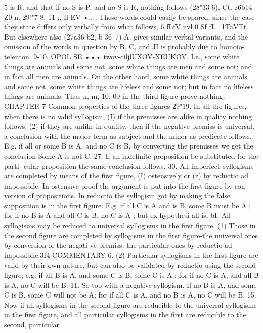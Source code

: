 {5 is R. and that if no S is P, and no S is R, nothing follows
(28"33-6). Ct. z6b14-Z0 n.
29'"7-8. 11 ;, Il EV •.. \nrapxn. These words could easily be
spared, since the case they state differs only verbally from what
follows, 6 fLfV nvl 0 Sf fL~ 1TaVTt. But elsewhere also (27a36-b2,
b 36--7) A. gives similar verbal variants, and the omission of the
words in question by B, C, and JI is probably due to homoio-
teleuton.
9-10. OPOL SE ••• twov-ciljlUXOV-XEUKOV. I.e., some white things
are animals and some not, some white things are men and some
not; and in fact all men are animals. On the other hand, some
white things are animals and some not, some white things are
lifeless and some not; but in fact no lifeless things are animals.
Thus n, m, 10, 00 in the third figure prove nothing.
CHAPTER 7
Common properties of the three figures
29"19. In all the figures, when there is no valid syllogism, (I)
if the premisses are alike in quality nothing follows; (2) if they are
unlike in quality, then if the negative premiss is universal, a
conclusion with the major term as subject and the minor as
predicate follows. E.g. if all or some B is A, and no C is B, by
converting the premisses we get the conclusion Some A is not C.
27. If an indefinite proposition be substituted for the parti-
cular proposition the same conclusion follows.
30. All imperfect syllogisms are completed by means of the
first figure, (I) ostensively or (z) by reductio ad impossibile. In
ostensive proof the argument is put into the first figure by con-
version of propositions. In reductio the syllogism got by making
the false supposition is in the first figure. E.g. if all C is A and is
B, some B must be A ; for if no B is A and all C is B, no C is
A ; but ex hypothesi all is.
bI. All syllogisms may be reduced to universal syllogisms in the
first figure. (1) Those in the second figure are completed by
syllogisms in the first figure-the universal ones by conversion of
the negati ve premiss, the particular ones by reductio ad impossibile.3I4
COMMENTARY
6. (2) Particular syllogisms in the first figure are valid by their
own nature, but can also be validated by reductio using the
second figure; e.g. if all B is A, and some C is B, some C is A ; for
if no C is A, and all B is A, no C will be B.
11. So too with a negative syllogism. If no B is A, and some
C is B, some C will not be A; for if all C is A, and no B is A, no
C will be B.
15. Now if all syllogisms in the second figure are reducible to
the universal syllogisms in the first figure, and all particular
syllogisms in the first are reducible to the second, particular
}
